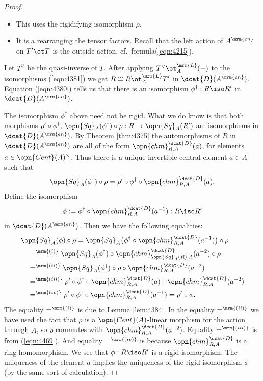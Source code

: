 \begin{proof}
\begin{itemize}
\item[$\cong^{5}$~:] This uses the rigidifying isomorphism $\rho$.

\item[$\cong^{6}$~:] It is a rearranging the tensor factors. Recall 
that the left action of $A^{\mrm{en}}$ on $T' \ot T$ is the outside action, 
cf.\ formula(\ref{eqn:4215}).
\end{itemize}

Let $T^{\vee}$ be the quasi-inverse of $T$. 
After applying $T^{\vee} \ot^{\mrm{L}}_{A} (-)$
to the isomorphisms (\ref{eqn:4381}) we get 
$R \cong R \ot^{\mrm{L}}_{A} T'$
in $\dcat{D}(A^{\mrm{en}})$. 
Equation (\ref{eqn:4380}) tells us that there is an isomorphism 
$\phi^{\dag} : R \iso R'$ in $\dcat{D}(A^{\mrm{en}})$. 

The isomorphism $\phi^{\dag}$ above need not be rigid. 
What we do know is that both morphisms 
$\rho' \circ \phi^{\dag}, \, \opn{Sq}_{A}(\phi^{\dag}) \circ \rho : 
R \to \opn{Sq}_{A}(R')$ 
are isomorphisms in $\dcat{D}(A^{\mrm{en}})$.
By Theorem \ref{thm:4375} the automorphisms of $R$ in $\dcat{D}(A^{\mrm{en}})$ 
are all of the form $\opn{chm}^{\dcat{D}}_{R, A}(a)$, 
for elements $a \in \opn{Cent}(A)^{\times}$.
Thus there is a unique invertible central element $a \in A$ such that  
\begin{equation} \label{eqn:4469}
\opn{Sq}_{A}(\phi^{\dag}) \circ \rho = 
\rho' \circ \phi^{\dag} \circ \opn{chm}^{\dcat{D}}_{R, A}(a) . 
\end{equation}
Define the isomorphism 
\[ \phi := \phi^{\dag} \circ \opn{chm}^{\dcat{D}}_{R, A}(a^{-1})
: R \iso R' \]
in $\dcat{D}(A^{\mrm{en}})$. 
Then we have the following equalities:
\[ \begin{aligned}
& 
\opn{Sq}_{A}(\phi) \circ \rho = 
\opn{Sq}_{A} \bigl( \phi^{\dag} \circ \opn{chm}^{\dcat{D}}_{R, A}(a^{-1}) 
\bigr) \circ \rho
\\ & \quad 
=^{\mrm{(i)}} \opn{Sq}_{A}(\phi^{\dag}) \circ 
\opn{chm}^{\dcat{D}}_{\opn{Sq}_{A}(R), A}(a^{-2}) \circ \rho
\\ & \quad 
=^{\mrm{(ii)}} \opn{Sq}_{A}(\phi^{\dag}) \circ \rho \circ 
\opn{chm}^{\dcat{D}}_{R, A}(a^{-2})
\\ & \quad 
=^{\mrm{(iii)}} \rho' \circ \phi^{\dag} \circ \opn{chm}^{\dcat{D}}_{R, A}(a)
\circ \opn{chm}^{\dcat{D}}_{R, A}(a^{-2})
\\ & \quad 
=^{\mrm{(iv)}} \rho' \circ \phi^{\dag} \circ \opn{chm}^{\dcat{D}}_{R, A}(a^{-1})
= \rho' \circ \phi . 
\end{aligned} \]
The equality $=^{\mrm{(i)}}$ is due to Lemma \ref{lem:4384}. In 
the equality $=^{\mrm{(ii)}}$ we have used the fact that $\rho$
is a $\opn{Cent}(A)$-linear morphism for the action through $A$, so $\rho$ 
commutes with $\opn{chm}^{\dcat{D}}_{R, A}(a^{-2})$.
Equality $=^{\mrm{(iii)}}$ is from (\ref{eqn:4469}). 
And equality $=^{\mrm{(iv)}}$ is because $\opn{chm}^{\dcat{D}}_{R, A}$ is a 
ring homomorphism. 
We see that $\phi : R \iso R'$ is a rigid isomorphism. The uniqueness of the 
element $a$ implies the uniqueness of the rigid isomorphism $\phi$ (by the 
same sort of calculation). 
\end{proof}

